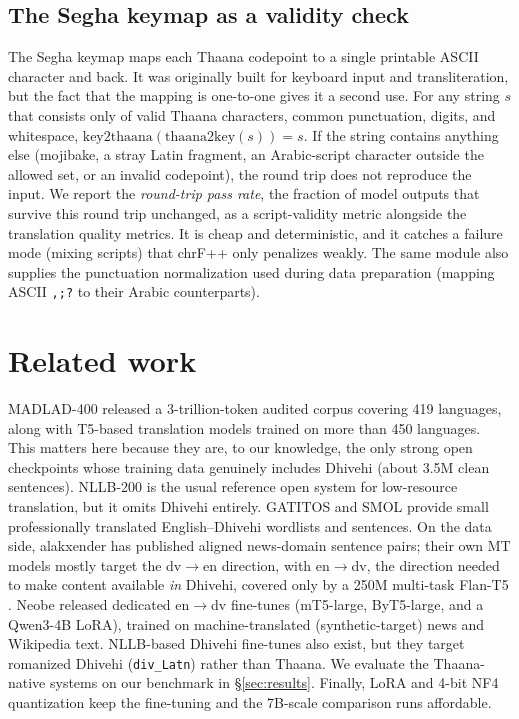 \documentclass[10pt,twocolumn]{article}
\begin{document}
\subsection{The Segha keymap as a validity check}
\label{sec:keymap}

The Segha keymap \citep{divtransliteration} maps each Thaana codepoint to
a single printable ASCII character and back. It was originally built for
keyboard input and transliteration, but the fact that the mapping is
one-to-one gives it a second use. For any string $s$ that consists only of
valid Thaana characters, common punctuation, digits, and whitespace,
$\mathrm{key2thaana}(\mathrm{thaana2key}(s)) = s$. If the string contains
anything else (mojibake, a stray Latin fragment, an Arabic-script
character outside the allowed set, or an invalid codepoint), the round
trip does not reproduce the input. We report the \emph{round-trip pass
rate}, the fraction of model outputs that survive this round trip
unchanged, as a script-validity metric alongside the translation quality
metrics. It is cheap and deterministic, and it catches a failure mode
(mixing scripts) that chrF++ only penalizes weakly. The same module also
supplies the punctuation normalization used during data preparation
(mapping ASCII \texttt{,;?} to their Arabic counterparts).

\section{Related work}

MADLAD-400 \citep{madlad400} released a 3-trillion-token audited corpus
covering 419 languages, along with T5-based \citep{t5} translation models
trained on more than 450 languages. This matters here because they are, to
our knowledge, the only strong open checkpoints whose training data
genuinely includes Dhivehi (about 3.5M clean sentences). NLLB-200
\citep{nllb} is the usual reference open system for low-resource
translation, but it omits Dhivehi entirely. GATITOS \citep{gatitos} and
SMOL \citep{smol} provide small professionally translated English--Dhivehi
wordlists and sentences. On the data side, alakxender
\citep{dhivehienglishtranslations} has published aligned news-domain
sentence pairs; their own MT models mostly target the dv$\to$en
direction, with en$\to$dv, the direction needed to make content
available \emph{in} Dhivehi, covered only by a 250M multi-task
Flan-T5 \citep{flant5endv}. Neobe \citep{neobeendv} released dedicated
en$\to$dv fine-tunes (mT5-large, ByT5-large, and a Qwen3-4B LoRA),
trained on machine-translated (synthetic-target) news and Wikipedia
text. NLLB-based Dhivehi fine-tunes also exist, but they target
romanized Dhivehi (\texttt{div\_Latn}) rather than Thaana. We evaluate
the Thaana-native systems on our benchmark in \S\ref{sec:results}.
Finally, LoRA \citep{lora}
and 4-bit NF4 quantization \citep{qlora} keep the fine-tuning and the
7B-scale comparison runs affordable.
\end{document}
